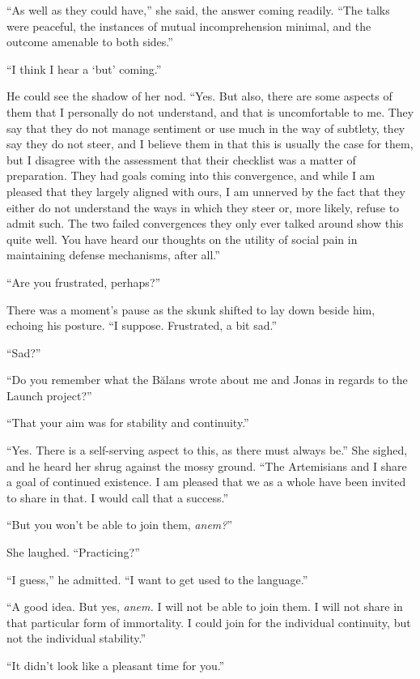 ``As well as they could have,'' she said, the answer coming readily. ``The talks were peaceful, the instances of mutual incomprehension minimal, and the outcome amenable to both sides.''

``I think I hear a `but' coming.''

He could see the shadow of her nod. ``Yes. But also, there are some aspects of them that I personally do not understand, and that is uncomfortable to me. They say that they do not manage sentiment or use much in the way of subtlety, they say they do not steer, and I believe them in that this is usually the case for them, but I disagree with the assessment that their checklist was a matter of preparation. They had goals coming into this convergence, and while I am pleased that they largely aligned with ours, I am unnerved by the fact that they either do not understand the ways in which they steer or, more likely, refuse to admit such. The two failed convergences they only ever talked around show this quite well. You have heard our thoughts on the utility of social pain in maintaining defense mechanisms, after all.''

``Are you frustrated, perhaps?''

There was a moment's pause as the skunk shifted to lay down beside him, echoing his posture. ``I suppose. Frustrated, a bit sad.''

``Sad?''

``Do you remember what the Bălans wrote about me and Jonas in regards to the Launch project?''

``That your aim was for stability and continuity.''

``Yes. There is a self-serving aspect to this, as there must always be.'' She sighed, and he heard her shrug against the mossy ground. ``The Artemisians and I share a goal of continued existence. I am pleased that we as a whole have been invited to share in that. I would call that a success.''

``But you won't be able to join them, \emph{anem?}''

She laughed. ``Practicing?''

``I guess,'' he admitted. ``I want to get used to the language.''

``A good idea. But yes, \emph{anem.} I will not be able to join them. I will not share in that particular form of immortality. I could join for the individual continuity, but not the individual stability.''

``It didn't look like a pleasant time for you.''

